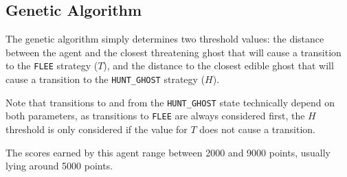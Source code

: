 \subsection{Genetic Algorithm}
The genetic algorithm simply determines two threshold values: the distance
between the agent and the closest threatening ghost that will cause a transition
to the \texttt{FLEE} strategy ($T$), and the distance to the closest edible
ghost that will cause a transition to the \texttt{HUNT\_GHOST} strategy ($H$).

Note that transitions to and from the \texttt{HUNT\_GHOST} state technically
depend on both parameters, as transitions to \texttt{FLEE} are always considered
first, the $H$ threshold is only considered if the value for $T$ does not cause
a transition.

The scores earned by this agent range between 2000 and 9000 points, usually
lying around 5000 points.


